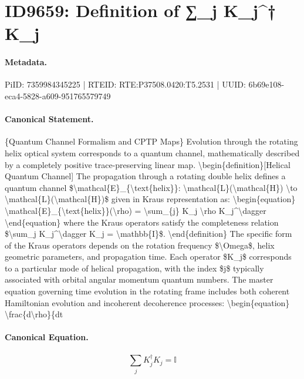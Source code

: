 \section*{ID9659: Definition of ∑\_j K\_j\textasciicircum{}† K\_j}
\paragraph{Metadata.}
PiID: 7359984345225 | RTEID: RTE:P37508.0420:T5.2531 | UUID: 6b69e108-eca4-5828-a609-951765579749

\paragraph{Canonical Statement.}
\{Quantum Channel Formalism and CPTP Maps\} Evolution through the rotating helix optical system corresponds to a quantum channel, mathematically described by a completely positive trace-preserving linear map. \textbackslash{}begin\{definition\}[Helical Quantum Channel] The propagation through a rotating double helix defines a quantum channel \$\textbackslash{}mathcal\{E\}\_\{\textbackslash{}text\{helix\}\}: \textbackslash{}mathcal\{L\}(\textbackslash{}mathcal\{H\}) \textbackslash{}to \textbackslash{}mathcal\{L\}(\textbackslash{}mathcal\{H\})\$ given in Kraus representation as: \textbackslash{}begin\{equation\} \textbackslash{}mathcal\{E\}\_\{\textbackslash{}text\{helix\}\}(\textbackslash{}rho) = \textbackslash{}sum\_\{j\} K\_j \textbackslash{}rho K\_j\textasciicircum{}\textbackslash{}dagger \textbackslash{}end\{equation\} where the Kraus operators satisfy the completeness relation \$\textbackslash{}sum\_j K\_j\textasciicircum{}\textbackslash{}dagger K\_j = \textbackslash{}mathbb\{I\}\$. \textbackslash{}end\{definition\} The specific form of the Kraus operators depends on the rotation frequency \$\textbackslash{}Omega\$, helix geometric parameters, and propagation time. Each operator \$K\_j\$ corresponds to a particular mode of helical propagation, with the index \$j\$ typically associated with orbital angular momentum quantum numbers. The master equation governing time evolution in the rotating frame includes both coherent Hamiltonian evolution and incoherent decoherence processes: \textbackslash{}begin\{equation\} \textbackslash{}frac\{d\textbackslash{}rho\}\{dt

\paragraph{Canonical Equation.}
\[
\sum_j K_j^\dagger K_j = \mathbb{I}
\]

